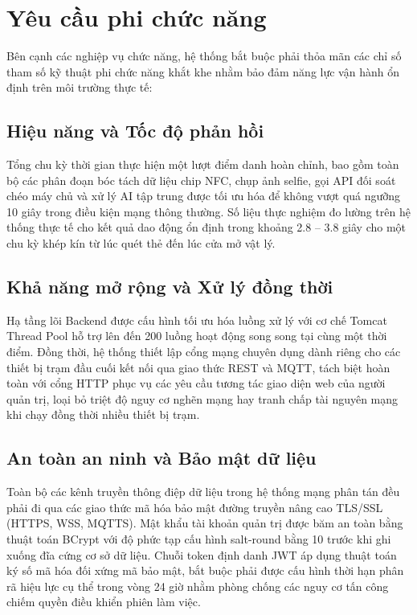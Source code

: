 \documentclass[../DoAn.tex]{subfiles}
\begin{document}
\section{Yêu cầu phi chức năng}
\label{section:2.4}

Bên cạnh các nghiệp vụ chức năng, hệ thống bắt buộc phải thỏa mãn các chỉ số tham số kỹ thuật phi chức năng khắt khe nhằm bảo đảm năng lực vận hành ổn định trên môi trường thực tế:

\subsection{Hiệu năng và Tốc độ phản hồi}
Tổng chu kỳ thời gian thực hiện một lượt điểm danh hoàn chỉnh, bao gồm toàn bộ các phân đoạn bóc tách dữ liệu chip NFC, chụp ảnh selfie, gọi API đối soát chéo máy chủ và xử lý AI tập trung được tối ưu hóa để không vượt quá ngưỡng 10 giây trong điều kiện mạng thông thường. Số liệu thực nghiệm đo lường trên hệ thống thực tế cho kết quả dao động ổn định trong khoảng 2.8 -- 3.8 giây cho một chu kỳ khép kín từ lúc quét thẻ đến lúc cửa mở vật lý.

\subsection{Khả năng mở rộng và Xử lý đồng thời}
Hạ tầng lõi Backend được cấu hình tối ưu hóa luồng xử lý với cơ chế Tomcat Thread Pool hỗ trợ lên đến 200 luồng hoạt động song song tại cùng một thời điểm. Đồng thời, hệ thống thiết lập cổng mạng chuyên dụng dành riêng cho các thiết bị trạm đầu cuối kết nối qua giao thức REST và MQTT, tách biệt hoàn toàn với cổng HTTP phục vụ các yêu cầu tương tác giao diện web của người quản trị, loại bỏ triệt độ nguy cơ nghẽn mạng hay tranh chấp tài nguyên mạng khi chạy đồng thời nhiều thiết bị trạm.

\subsection{An toàn an ninh và Bảo mật dữ liệu}
Toàn bộ các kênh truyền thông điệp dữ liệu trong hệ thống mạng phân tán đều phải đi qua các giao thức mã hóa bảo mật đường truyền nâng cao TLS/SSL (HTTPS, WSS, MQTTS). Mật khẩu tài khoản quản trị được băm an toàn bằng thuật toán BCrypt với độ phức tạp cấu hình salt-round bằng 10 trước khi ghi xuống đĩa cứng cơ sở dữ liệu. Chuỗi token định danh JWT áp dụng thuật toán ký số mã hóa đối xứng mã bảo mật, bắt buộc phải được cấu hình thời hạn phân rã hiệu lực cụ thể trong vòng 24 giờ nhằm phòng chống các nguy cơ tấn công chiếm quyền điều khiển phiên làm việc.
\end{document}
